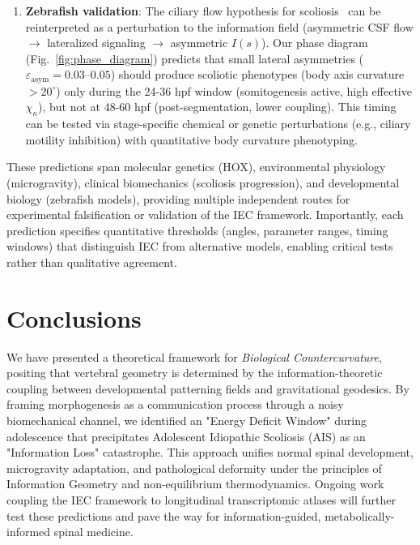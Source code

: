 \documentclass[11pt,a4paper]{article}
\begin{document}
\begin{enumerate}
\item \textbf{Zebrafish validation}: The ciliary flow hypothesis for scoliosis~\cite{grimes2016zebrafish} can be reinterpreted as a perturbation to the information field (asymmetric CSF flow $\to$ lateralized signaling $\to$ asymmetric $I(s)$). Our phase diagram (Fig.~\ref{fig:phase_diagram}) predicts that small lateral asymmetries ($\varepsilon_{\mathrm{asym}} = 0.03$--$0.05$) should produce scoliotic phenotypes (body axis curvature $>20^\circ$) only during the 24-36 hpf window (somitogenesis active, high effective $\chi_\kappa$), but not at 48-60 hpf (post-segmentation, lower coupling). This timing can be tested via stage-specific chemical or genetic perturbations (e.g., ciliary motility inhibition) with quantitative body curvature phenotyping.
\end{enumerate}
These predictions span molecular genetics (HOX), environmental physiology (microgravity), clinical biomechanics (scoliosis progression), and developmental biology (zebrafish models), providing multiple independent routes for experimental falsification or validation of the IEC framework. Importantly, each prediction specifies quantitative thresholds (angles, parameter ranges, timing windows) that distinguish IEC from alternative models, enabling critical tests rather than qualitative agreement.


\section{Conclusions}

We have presented a theoretical framework for \emph{Biological Countercurvature}, positing that vertebral geometry is determined by the information-theoretic coupling between developmental patterning fields and gravitational geodesics. By framing morphogenesis as a communication process through a noisy biomechanical channel, we identified an "Energy Deficit Window" during adolescence that precipitates Adolescent Idiopathic Scoliosis (AIS) as an "Information Loss" catastrophe. This approach unifies normal spinal development, microgravity adaptation, and pathological deformity under the principles of Information Geometry and non-equilibrium thermodynamics. Ongoing work coupling the IEC framework to longitudinal transcriptomic atlases will further test these predictions and pave the way for information-guided, metabolically-informed spinal medicine.
\end{document}
